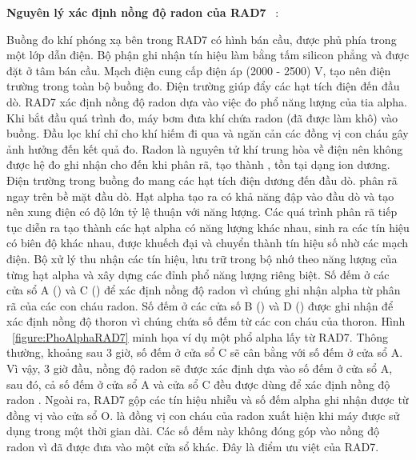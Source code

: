     \textbf{Nguyên lý xác định nồng độ radon của RAD7} ~\cite{Thesis:HNPThu}: 
    
    Buồng đo khí phóng xạ bên trong RAD7 có hình bán cầu, được phủ phía trong một lớp dẫn điện. Bộ phận ghi nhận tín hiệu làm bằng tấm silicon phẳng và được đặt ở tâm bán cầu. Mạch điện cung cấp điện áp (2000 - 2500) V, tạo nên điện trường trong toàn bộ buồng đo. Điện trường giúp đẩy các hạt tích điện đến đầu dò. RAD7 xác định nồng độ radon dựa vào việc đo phổ năng lượng của tia alpha. Khi bắt đầu quá trình đo, máy bơm đưa khí chứa radon (đã được làm khô) vào buồng. Đầu lọc khí chỉ cho khí hiếm đi qua và ngăn cản các đồng vị con cháu gây ảnh hưởng đến kết quả đo. Radon là nguyên tử khí trung hòa về điện nên không được hệ đo ghi nhận cho đến khi phân rã, tạo thành , tồn tại dạng ion dương. Điện trường trong buồng đo mang các hạt tích điện dương đến đầu dò.  phân rã ngay trên bề mặt đầu dò. Hạt alpha tạo ra có khả năng đập vào đầu dò và tạo nên xung điện có độ lớn tỷ lệ thuận với năng lượng. Các quá trình phân rã tiếp tục diễn ra tạo thành các hạt alpha có năng lượng khác nhau, sinh ra các tín hiệu có biên độ khác nhau, được khuếch đại và chuyển thành tín hiệu số nhờ các mạch điện. Bộ xử lý thu nhận các tín hiệu, lưu trữ trong bộ nhớ theo năng lượng của từng hạt alpha và xây dựng các đỉnh phổ năng lượng riêng biệt. Số đếm ở các cửa sổ A () và C () để xác định nồng độ radon vì chúng ghi nhận alpha từ phân rã của các con cháu radon. Số đếm ở các cửa số B () và D () được ghi nhận để xác định nồng độ thoron vì chúng chứa số đếm từ các con cháu của thoron. Hình ~\ref{figure:PhoAlphaRAD7} minh họa ví dụ một phổ alpha lấy từ RAD7. Thông thường, khoảng sau 3 giờ, số đếm ở cửa sổ C sẽ cân bằng với số đếm ở cửa sổ A. Vì vậy, 3 giờ đầu, nồng độ radon sẽ được xác định dựa vào số đếm ở cửa sổ A, sau đó, cả số đếm ở cửa sổ A và cửa sổ C đều được dùng để xác định nồng độ radon . Ngoài ra, RAD7 gộp các tín hiệu nhiễu và số đếm alpha ghi nhận được từ đồng vị  vào cửa sổ O.  là đồng vị con cháu của radon xuất hiện khi máy được sử dụng trong một thời gian dài. Các số đếm này không đóng góp vào nồng độ radon vì đã được đưa vào một cửa sổ khác. Đây là điểm ưu việt của RAD7.


